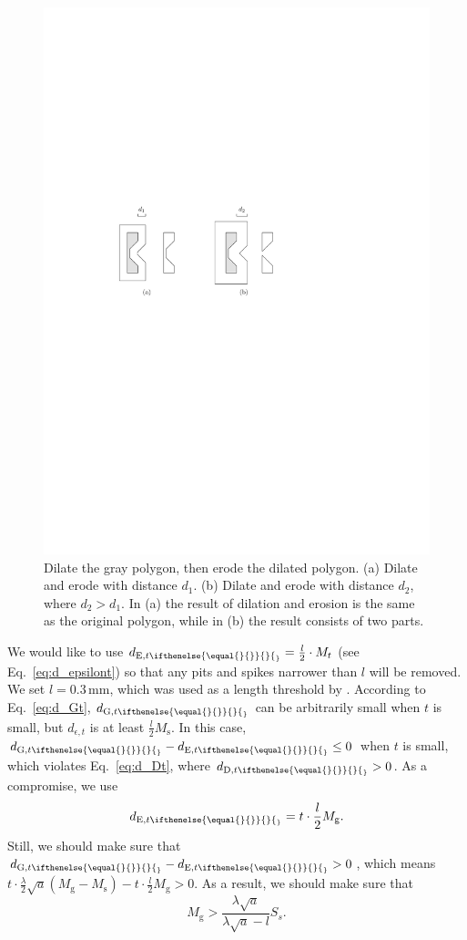 \documentclass[graybox]{svmult}
\newcommand{\eq}{Eq.~}
\newcommand{\dtrm}[2][]{d_{\mathrm{#2}, t\ifthenelse{\equal{#1}{}}{}{_#1}}}
\begin{document}
\begin{figure}[tb]
	\centering
	\includegraphics[]{ErosionBreak}
	\caption{Dilate the gray polygon, then erode the dilated polygon.
		(a) Dilate and erode with distance $d_1$.
		(b) Dilate and erode with distance $d_2$, where $d_2>d_1$.
		In (a) the result of dilation and erosion is the same as the original 
		polygon, while in (b) the result consists of two parts.
	}
	\label{fig:ErosionBreak}
\end{figure}

We would like to use $\dtrm{E}=\frac{l}{2} \cdot M_t$
(see \eq\ref{eq:d_epsilont}) so that
any pits and spikes narrower than $l$ will be removed. 
We set $l=0.3\,\mathrm{mm}$, which was used as a length threshold by 
\textcite{Regnauld2001,Li2004,Basaraner2008}.
According to \eq\ref{eq:d_Gt}, $\dtrm{G}$ can be arbitrarily small 
when $t$ is small, 
but $d_{\epsilon, t}$ is at least $\frac{l}{2} M_\mathrm{s}$. 
In this case, $\dtrm{G}-\dtrm{E} \le 0$ when $t$ is small, 
which violates \eq\ref{eq:d_Dt}, where $\dtrm{D}>0$.
As a compromise, we use
\begin{equation}
\label{eq:d_Et}
\dtrm{E} =t \cdot \frac{l}{2} M_\mathrm{g}.
\end{equation}
Still, we should make sure that $\dtrm{G}-\dtrm{E} > 0$, which means
$t \cdot \frac{\lambda}{2}\sqrt{a} (M_\mathrm{g}-M_\mathrm{s})-
t \cdot \frac{l}{2} M_\mathrm{g} >0$.
As a result, we should make sure that
\begin{equation}
\label{eq:S_g}
M_\mathrm{g} > \frac{\lambda\sqrt{a}}{\lambda\sqrt{a}-l} S_s.
\end{equation}
\end{document}
